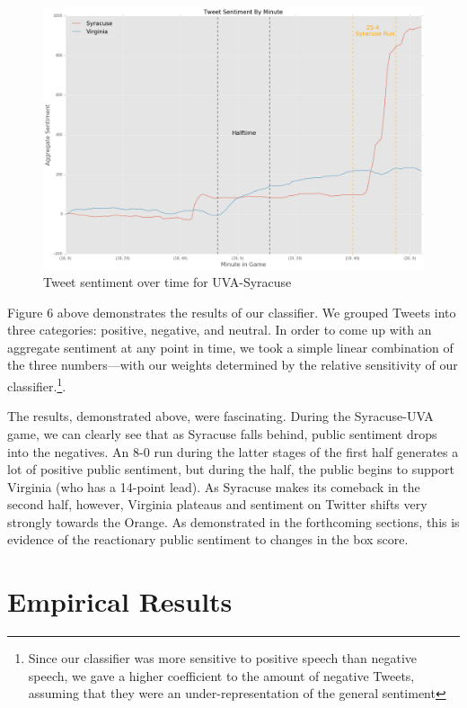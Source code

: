 \documentclass[12pt]{article}
\begin{document}
\begin{doublespacing}
\begin{figure} [H]
	\centering
	\includegraphics[scale = 0.4] {Images/Cuse_UVA_TweetSentiment.png} 
	\caption{Tweet sentiment over time for UVA-Syracuse}
\end{figure}

Figure 6 above demonstrates the results of our classifier. We grouped Tweets into three categories: positive, negative, and neutral. In order to come up with an aggregate sentiment at any point in time, we took a simple linear combination of the three numbers---with our weights determined by the relative sensitivity of our classifier.\footnote{Since our classifier was more sensitive to positive speech than negative speech, we gave a higher coefficient to the amount of negative Tweets, assuming that they were an under-representation of the general sentiment}. 

The results, demonstrated above, were fascinating. During the Syracuse-UVA game, we can clearly see that as Syracuse falls behind, public sentiment drops into the negatives. An 8-0 run during the latter stages of the first half generates a lot of positive public sentiment, but during the half, the public begins to support Virginia (who has a 14-point lead). As Syracuse makes its comeback in the second half, however, Virginia plateaus and sentiment on Twitter shifts very strongly towards the Orange. As demonstrated in the forthcoming sections, this is evidence of the reactionary public sentiment to changes in the box score. 

\section{Empirical Results}


\end{doublespacing}
\end{document}
